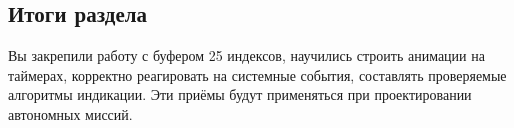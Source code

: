 \subsection*{Итоги раздела}
Вы закрепили работу с буфером 25 индексов, научились строить анимации на таймерах, корректно реагировать на системные события, составлять проверяемые алгоритмы индикации. Эти приёмы будут применяться при проектировании автономных миссий.
